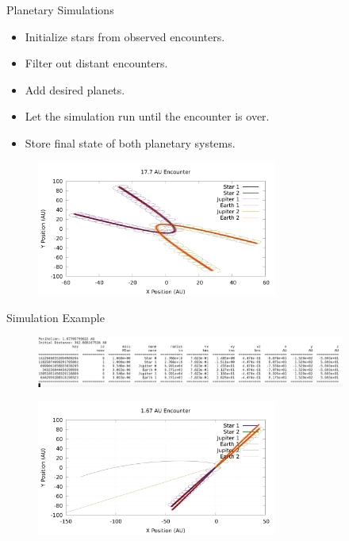\documentclass{beamer}
\begin{document}
\begin{frame}{Planetary Simulations}
    \begin{itemize}
        \item Initialize stars from observed encounters.
        \item Filter out distant encounters.
        \item Add desired planets.
        \item Let the simulation run until the encounter is over.
        \item Store final state of both planetary systems.
    \end{itemize}
    \begin{figure}
        \centering
        \includegraphics[height=1.75in]{17_7_AU}
    \end{figure}
\end{frame}

\begin{frame}{Simulation Example}
    \begin{figure}
        \centering
        \includegraphics[width=4.00in]{Params.png}
    \end{figure}
    \begin{figure}
        \centering
        \includegraphics[height=1.75in]{ejection.png}
    \end{figure}
\end{frame}
\end{document}
